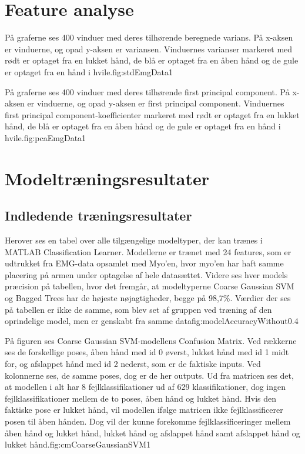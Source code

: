 \thispagestyle{fancy}




\chapter{Feature analyse}
{På graferne ses 400 vinduer med deres tilhørende beregnede varians. På x-aksen er vinduerne, og opad y-aksen er variansen. Vinduernes varianser markeret med rødt er optaget fra en lukket hånd, de blå er optaget fra en åben hånd og de gule er optaget fra en hånd i hvile.}{fig:stdEmgData}{1}
 
{På graferne ses 400 vinduer med deres tilhørende first principal component. På x-aksen er vinduerne, og opad y-aksen er first principal component. Vinduernes first principal component-koefficienter markeret med rødt er optaget fra en lukket hånd, de blå er optaget fra en åben hånd og de gule er optaget fra en hånd i hvile.}{fig:pcaEmgData}{1}

\chapter{Modeltræningsresultater}
\section{Indledende træningsresultater}
{Herover ses en tabel over alle tilgængelige modeltyper, der kan trænes i MATLAB Classification Learner. Modellerne er trænet med 24 features, som er udtrukket fra EMG-data opsamlet med Myo'en, hvor myo'en har haft samme placering på armen under optagelse af hele datasættet. Videre ses hver models præcision på tabellen, hvor det fremgår, at modeltyperne Coarse Gaussian SVM og Bagged Trees har de højeste nøjagtigheder, begge på 98,7\%. Værdier der ses på tabellen er ikke de samme, som blev set af gruppen ved træning af den oprindelige model, men er genskabt fra samme data}{fig:modelAccuracyWithout}{0.4}

{På figuren ses Coarse Gaussian SVM-modellens Confusion Matrix. Ved rækkerne ses de forskellige poses, åben hånd med id 0 øverst, lukket hånd med id 1 midt for, og afslappet hånd med id 2 nederst, som er de faktiske inputs. Ved kolonnerne ses, de samme poses, dog er de her outputs. Ud fra matricen ses det, at modellen i alt har 8 fejlklassifikationer ud af 629 klassifikationer, dog ingen fejlklassifikationer mellem de to poses, åben hånd og lukket hånd. Hvis den faktiske pose er lukket hånd, vil modellen ifølge matricen ikke fejlklassificerer posen til åben hånden. Dog vil der kunne forekomme fejlklassificeringer mellem åben hånd og lukket hånd, lukket hånd og afslappet hånd samt afslappet hånd og lukket hånd.}{fig:cmCoarseGaussianSVM}{1} 

